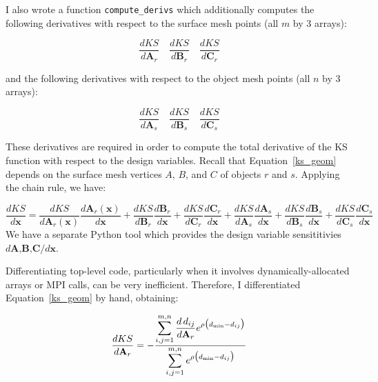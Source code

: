 \documentclass[11pt,letterpaper]{article}
\begin{document}
I also wrote a function \texttt{compute\_derivs} which additionally computes the following derivatives with respect to the surface mesh points (all $m$ by 3 arrays):

\begin{equation}
  \frac{dKS}{d\textbf{A}_r} \, \, \, \, \, \, \frac{dKS}{d\textbf{B}_r} \, \, \, \, \, \, \frac{dKS}{d\textbf{C}_r}
\end{equation}

and the following derivatives with respect to the object mesh points (all $n$ by 3 arrays):

\begin{equation}
  \frac{dKS}{d\textbf{A}_s} \, \, \, \, \, \, \frac{dKS}{d\textbf{B}_s} \, \, \, \, \, \, \frac{dKS}{d\textbf{C}_s}
\end{equation}

These derivatives are required in order to compute the total derivative of the KS function with respect to the design variables.
Recall that Equation~\ref{ks_geom} depends on the surface mesh vertices $A$, $B$, and $C$ of objects $r$ and $s$.
Applying the chain rule, we have:

\begin{equation}
  \frac{dKS}{d\textbf{x}} = \frac{dKS}{d\textbf{A}_r(\textbf{x})} \frac{d\textbf{A}_r(\textbf{x})}{d\textbf{x}} +
                            \frac{dKS}{d\textbf{B}_r} \frac{d\textbf{B}_r}{d\textbf{x}} +
                            \frac{dKS}{d\textbf{C}_r} \frac{d\textbf{C}_r}{d\textbf{x}} +
                            \frac{dKS}{d\textbf{A}_s} \frac{d\textbf{A}_s}{d\textbf{x}} +
                            \frac{dKS}{d\textbf{B}_s} \frac{d\textbf{B}_s}{d\textbf{x}} +
                            \frac{dKS}{d\textbf{C}_s} \frac{d\textbf{C}_s}{d\textbf{x}}
\end{equation}
We have a separate Python tool which provides the design variable sensititivies $d\textbf{A,B,C}/d\textbf{x}$.


\qquad Differentiating top-level code, particularly when it involves dynamically-allocated arrays or MPI calls, can be very inefficient.
Therefore, I differentiated Equation~\ref{ks_geom} by hand, obtaining:

\begin{equation}
  \frac{dKS}{d\textbf{A}_r} = -\frac{\mathlarger{\sum_{i,j=1}^{m,n} \frac{d\,d_{ij}}{d\textbf{A}_r}e^{\rho\big(d_\text{min}-d_{ij}\big)}}}
  {\mathlarger{\sum_{i,j=1}^{m,n} e^{\rho\big(d_\text{min}-d_{ij}\big)}}}
\end{equation}
\end{document}
